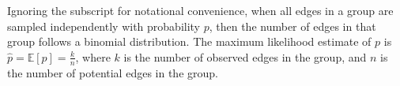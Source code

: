 \documentclass[11pt]{article}
\begin{document}
\noindent 
Ignoring the subscript for notational convenience, when all edges in a group are sampled independently with probability $p$, then the number of edges in that group follows a binomial distribution. The maximum likelihood estimate of $p$ is 
%
%
%
%
%
%
$    \hat{p} = \mathbb{E}[p] = \frac{k}{n}$, where $k$ is the number of observed edges in the group, and $n$ is the number of potential edges in the group. 
\end{document}
